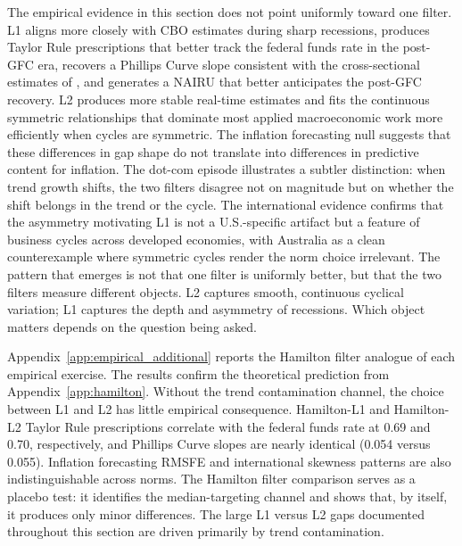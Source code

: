\documentclass[10pt]{article}
\begin{document}
The empirical evidence in this section does not point uniformly toward one filter. L1 aligns more closely with CBO estimates during sharp recessions, produces Taylor Rule prescriptions that better track the federal funds rate in the post-GFC era, recovers a Phillips Curve slope consistent with the cross-sectional estimates of \citet{hazell_etal2022}, and generates a NAIRU that better anticipates the post-GFC recovery. L2 produces more stable real-time estimates and fits the continuous symmetric relationships that dominate most applied macroeconomic work more efficiently when cycles are symmetric. The inflation forecasting null suggests that these differences in gap shape do not translate into differences in predictive content for inflation. The dot-com episode illustrates a subtler distinction: when trend growth shifts, the two filters disagree not on magnitude but on whether the shift belongs in the trend or the cycle. The international evidence confirms that the asymmetry motivating L1 is not a U.S.-specific artifact but a feature of business cycles across developed economies, with Australia as a clean counterexample where symmetric cycles render the norm choice irrelevant. The pattern that emerges is not that one filter is uniformly better, but that the two filters measure different objects. L2 captures smooth, continuous cyclical variation; L1 captures the depth and asymmetry of recessions. Which object matters depends on the question being asked.

Appendix~\ref{app:empirical_additional} reports the Hamilton filter analogue of each empirical exercise. The results confirm the theoretical prediction from Appendix~\ref{app:hamilton}. Without the trend contamination channel, the choice between L1 and L2 has little empirical consequence. Hamilton-L1 and Hamilton-L2 Taylor Rule prescriptions correlate with the federal funds rate at 0.69 and 0.70, respectively, and Phillips Curve slopes are nearly identical (0.054 versus 0.055). Inflation forecasting RMSFE and international skewness patterns are also indistinguishable across norms. The Hamilton filter comparison serves as a placebo test: it identifies the median-targeting channel and shows that, by itself, it produces only minor differences. The large L1 versus L2 gaps documented throughout this section are driven primarily by trend contamination.

\end{document}
